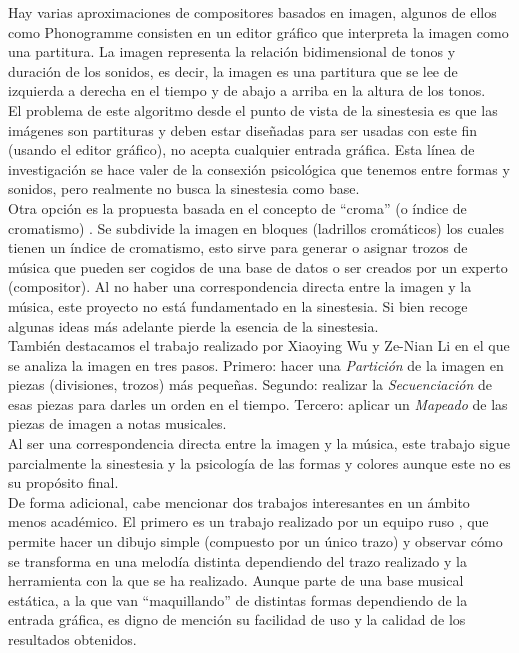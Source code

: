 Hay varias aproximaciones de compositores basados en imagen, algunos de ellos como Phonogramme \cite{ImageBaseComposition} \cite{Phonogramme} consisten en un editor gráfico que interpreta la imagen como una partitura. La imagen representa la relación bidimensional de tonos y duración de los sonidos, es decir, la imagen es una partitura que se lee de izquierda a derecha en el tiempo y de abajo a arriba en la altura de los tonos. 
\\El problema de este algoritmo desde el punto de vista de la sinestesia es que las imágenes son partituras y deben estar diseñadas para ser usadas con este fin (usando el editor gráfico), no acepta cualquier entrada gráfica. Esta línea de investigación se hace valer de la consexión psicológica que tenemos entre formas y sonidos, pero realmente no busca la sinestesia como base.\\

Otra opción es la propuesta basada en el concepto de ``croma'' (o índice de cromatismo) \cite{bricksConvertsMusic}. Se subdivide la imagen en bloques (ladrillos cromáticos) los cuales tienen un índice de cromatismo, esto sirve para generar o asignar trozos de música que pueden ser cogidos de una base de datos o ser creados por un experto (compositor). Al no haber una correspondencia directa entre la imagen y la música, este proyecto no está fundamentado en la sinestesia. Si bien recoge algunas ideas más adelante pierde la esencia de la sinestesia.\\

También destacamos el trabajo realizado por Xiaoying Wu y Ze-Nian Li \cite{ImageBaseComposition} en el que se analiza la imagen en tres pasos. Primero: hacer una \emph{Partición} de la imagen en piezas (divisiones, trozos) más pequeñas. Segundo: realizar la \emph{Secuenciación} de esas piezas para darles un orden en el tiempo. Tercero: aplicar un \emph{Mapeado} de las piezas de imagen a notas musicales.
\\Al ser una correspondencia directa entre la imagen y la música, este trabajo sigue parcialmente la sinestesia y la psicología de las formas y colores aunque este no es su propósito final.\\ 

De forma adicional, cabe mencionar dos trabajos interesantes en un ámbito menos académico.
El primero es un trabajo realizado por un equipo ruso \cite{dibujosymusica}, que permite hacer un dibujo simple (compuesto por un único trazo) y observar cómo se transforma en una melodía distinta dependiendo del trazo realizado y la herramienta con la que se ha realizado. Aunque parte de una base musical estática, a la que van ``maquillando'' de distintas formas dependiendo de la entrada gráfica, es digno de mención su facilidad de uso y la calidad de los resultados obtenidos.\\

